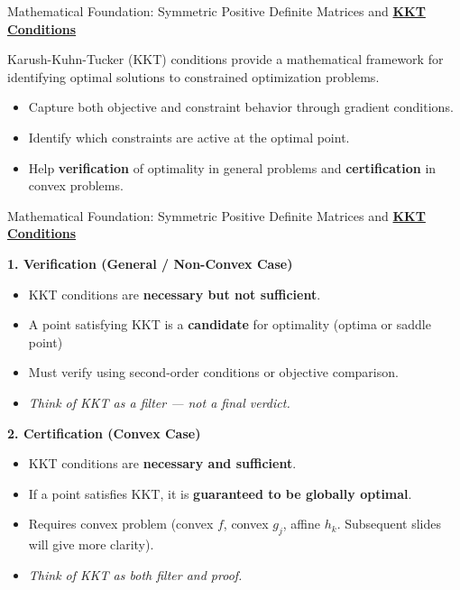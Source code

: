 \documentclass{beamer}
\begin{document}

\begin{frame}{{Mathematical Foundation: Symmetric Positive Definite Matrices and \textbf{\underline{KKT Conditions}}}}

    Karush-Kuhn-Tucker (KKT) conditions provide a mathematical framework for identifying optimal solutions to constrained optimization problems.
    
    \begin{itemize}
        \item Capture both objective and constraint behavior through gradient conditions.
        \item Identify which constraints are active at the optimal point.
        \item Help \textbf{verification} of optimality in general problems and \textbf{certification} in convex problems.
    \end{itemize}

\end{frame}


\begin{frame}{{Mathematical Foundation: Symmetric Positive Definite Matrices and \textbf{\underline{KKT Conditions}}}}

    \textbf{1. Verification (General / Non-Convex Case)}
    \begin{itemize}
        \item KKT conditions are \textbf{necessary but not sufficient}.
        \item A point satisfying KKT is a \textbf{candidate} for optimality (optima or saddle point)
        \item Must verify using second-order conditions or objective comparison.
        \item \textit{Think of KKT as a filter — not a final verdict.}
    \end{itemize}
    
    \medskip
    
    \textbf{2. Certification (Convex Case)}
    \begin{itemize}
        \item KKT conditions are \textbf{necessary and sufficient}.
        \item If a point satisfies KKT, it is \textbf{guaranteed to be globally optimal}.
        \item Requires convex problem (convex $f$, convex $g_j$, affine $h_k$. Subsequent slides will give more clarity).
        \item \textit{Think of KKT as both filter and proof.}
    \end{itemize}

\end{frame}
\end{document}
